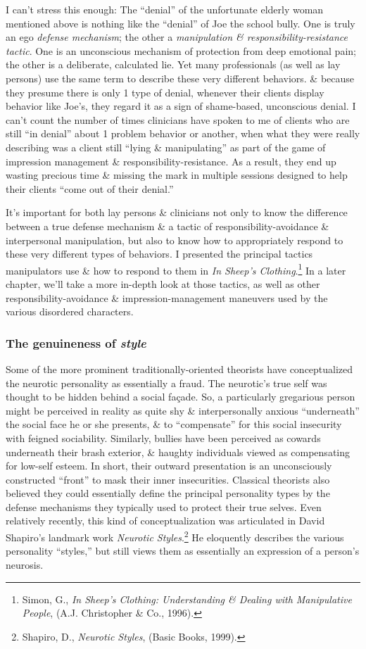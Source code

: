 \documentclass{article}
\numberwithin{equation}{section}
\begin{document}
I can't stress this enough: The ``denial'' of the unfortunate elderly woman mentioned above is nothing like the ``denial'' of Joe the school bully. One is truly an ego \textit{defense mechanism}; the other a \textit{manipulation \& responsibility-resistance tactic}. One is an unconscious mechanism of protection from deep emotional pain; the other is a deliberate, calculated lie. Yet many professionals (as well as lay persons) use the same term to describe these very different behaviors. \& because they presume there is only 1 type of denial, whenever their clients display behavior like Joe's, they regard it as a sign of shame-based, unconscious denial. I can't count the number of times clinicians have spoken to me of clients who are still ``in denial'' about 1 problem behavior or another, when what they were really describing was a client still ``lying \& manipulating'' as part of the game of impression management \& responsibility-resistance. As a result, they end up wasting precious time \& missing the mark in multiple sessions designed to help their clients ``come out of their denial.''

It's important for both lay persons \& clinicians not only to know the difference between a true defense mechanism \& a tactic of responsibility-avoidance \& interpersonal manipulation, but also to know how to appropriately respond to these very different types of behaviors. I presented the principal tactics manipulators use \& how to respond to them in \textit{In Sheep's Clothing}.\footnote{Simon, G., \textit{In Sheep's Clothing: Understanding \& Dealing with Manipulative People}, (A.J. Christopher \& Co., 1996).} In a later chapter, we'll take a more in-depth look at those tactics, as well as other responsibility-avoidance \& impression-management maneuvers used by the various disordered characters.

\subsubsection{The genuineness of \textit{style}}
Some of the more prominent traditionally-oriented theorists have conceptualized the neurotic personality as essentially a fraud. The neurotic's true self was thought to be hidden behind a social fa\c{c}ade. So, a particularly gregarious person might be perceived in reality as quite shy \& interpersonally anxious ``underneath'' the social face he or she presents, \& to ``compensate'' for this social insecurity with feigned sociability. Similarly, bullies have been perceived as cowards underneath their brash exterior, \& haughty individuals viewed as compensating for low-self esteem. In short, their outward presentation is an unconsciously constructed ``front'' to mask their inner insecurities. Classical theorists also believed they could essentially define the principal personality types by the defense mechanisms they typically used to protect their true selves. Even relatively recently, this kind of conceptualization was articulated in David Shapiro's landmark work \textit{Neurotic Styles}.\footnote{Shapiro, D., \textit{Neurotic Styles}, (Basic Books, 1999).} He eloquently describes the various personality ``styles,'' but still views them as essentially an expression of a person's neurosis.
\end{document}
